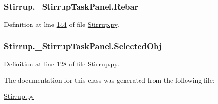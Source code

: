 \subsubsection[{\texorpdfstring{Rebar}{Rebar}}]{\setlength{\rightskip}{0pt plus 5cm}Stirrup.\+\_\+\+Stirrup\+Task\+Panel.\+Rebar}\hypertarget{classStirrup_1_1__StirrupTaskPanel_a004a341f992f38ca54893edf92f85faa}{}\label{classStirrup_1_1__StirrupTaskPanel_a004a341f992f38ca54893edf92f85faa}


Definition at line \hyperlink{Stirrup_8py_source_l00144}{144} of file \hyperlink{Stirrup_8py_source}{Stirrup.\+py}.

\subsubsection[{\texorpdfstring{Selected\+Obj}{SelectedObj}}]{\setlength{\rightskip}{0pt plus 5cm}Stirrup.\+\_\+\+Stirrup\+Task\+Panel.\+Selected\+Obj}\hypertarget{classStirrup_1_1__StirrupTaskPanel_a25d8b984bd2817ec46c1375b6bec647d}{}\label{classStirrup_1_1__StirrupTaskPanel_a25d8b984bd2817ec46c1375b6bec647d}


Definition at line \hyperlink{Stirrup_8py_source_l00128}{128} of file \hyperlink{Stirrup_8py_source}{Stirrup.\+py}.



The documentation for this class was generated from the following file\+:\begin{DoxyCompactItemize}
\item 
\hyperlink{Stirrup_8py}{Stirrup.\+py}\end{DoxyCompactItemize}
